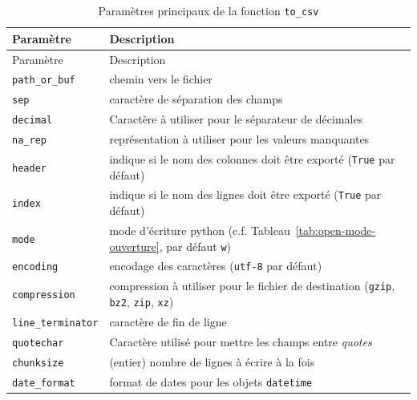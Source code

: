 \documentclass[
  12pt,
]{book}
\numberwithin{equation}{section}
\numberwithin{countremarque}{section}
\begin{document}
\begin{longtable}[]{@{}
  >{\raggedleft\arraybackslash}p{}
  >{\raggedleft\arraybackslash}p{}@{}}
\caption{\label{tab:pandasto-csv} Paramètres principaux de la fonction \texttt{to\_csv}}\tabularnewline
\toprule\noalign{}
\begin{minipage}[b]{\linewidth}\raggedleft
Paramètre
\end{minipage} & \begin{minipage}[b]{\linewidth}\raggedleft
Description
\end{minipage} \\
\midrule\noalign{}
\endfirsthead
\toprule\noalign{}
\begin{minipage}[b]{\linewidth}\raggedleft
Paramètre
\end{minipage} & \begin{minipage}[b]{\linewidth}\raggedleft
Description
\end{minipage} \\
\midrule\noalign{}
\endhead
\bottomrule\noalign{}
\endlastfoot
\texttt{path\_or\_buf} & chemin vers le fichier \\
\texttt{sep} & caractère de séparation des champs \\
\texttt{decimal} & Caractère à utiliser pour le séparateur de décimales \\
\texttt{na\_rep} & représentation à utiliser pour les valeurs manquantes \\
\texttt{header} & indique si le nom des colonnes doit être exporté (\texttt{True} par défaut) \\
\texttt{index} & indique si le nom des lignes doit être exporté (\texttt{True} par défaut) \\
\texttt{mode} & mode d'écriture python (c.f. Tableau~\ref{tab:open-mode-ouverture}, par défaut \texttt{w}) \\
\texttt{encoding} & encodage des caractères (\texttt{utf-8} par défaut) \\
\texttt{compression} & compression à utiliser pour le fichier de destination (\texttt{gzip}, \texttt{bz2}, \texttt{zip}, \texttt{xz}) \\
\texttt{line\_terminator} & caractère de fin de ligne \\
\texttt{quotechar} & Caractère utilisé pour mettre les champs entre \emph{quotes} \\
\texttt{chunksize} & (entier) nombre de lignes à écrire à la fois \\
\texttt{date\_format} & format de dates pour les objets \texttt{datetime} \\
\end{longtable}
\end{document}
